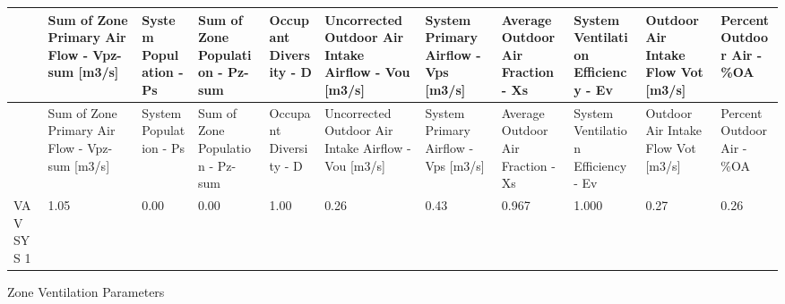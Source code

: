{\scriptsize
\begin{longtable}[c]{>{\raggedright}p{0.54in}>{\raggedright}p{0.54in}>{\raggedright}p{0.54in}>{\raggedright}p{0.54in}>{\raggedright}p{0.54in}>{\raggedright}p{0.54in}>{\raggedright}p{0.54in}>{\raggedright}p{0.54in}>{\raggedright}p{0.54in}>{\raggedright}p{0.54in}>{\raggedright}p{0.54in}}
\toprule 
 & Sum of Zone Primary Air Flow - Vpz-sum [m3/s] & System Population - Ps & Sum of Zone Population - Pz-sum & Occupant Diversity - D & Uncorrected Outdoor Air Intake Airflow - Vou [m3/s] & System Primary Airflow - Vps [m3/s] & Average Outdoor Air Fraction - Xs & System Ventilation Efficiency - Ev & Outdoor Air Intake Flow Vot [m3/s] & Percent Outdoor Air - \%OA \tabularnewline
\midrule
\endfirsthead

\toprule 
 & Sum of Zone Primary Air Flow - Vpz-sum [m3/s] & System Population - Ps & Sum of Zone Population - Pz-sum & Occupant Diversity - D & Uncorrected Outdoor Air Intake Airflow - Vou [m3/s] & System Primary Airflow - Vps [m3/s] & Average Outdoor Air Fraction - Xs & System Ventilation Efficiency - Ev & Outdoor Air Intake Flow Vot [m3/s] & Percent Outdoor Air - \%OA \tabularnewline
\midrule
\endhead

VAV SYS 1 & 1.05 & 0.00 & 0.00 & 1.00 & 0.26 & 0.43 & 0.967 & 1.000 & 0.27 & 0.26 \tabularnewline
\bottomrule
\end{longtable}}

Zone Ventilation Parameters

